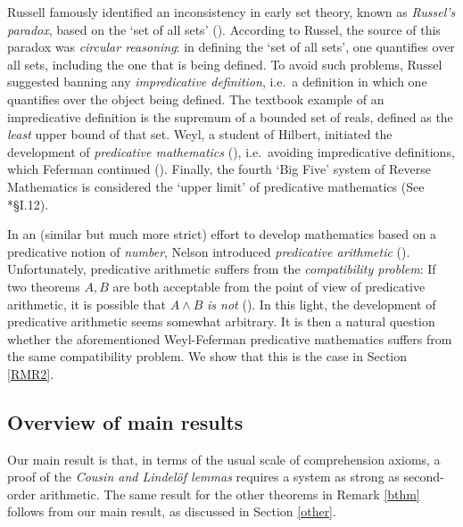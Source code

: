 \documentclass[reqno]{amsart}
\numberwithin{equation}{section}
\numberwithin{thm}{section}
\begin{document}
\smallskip

Russell famously identified an inconsistency in early set theory, known as \emph{Russel's paradox}, based on the `set of all sets' (\cite{vajuju}).  
According to Russel, the source of this paradox was \emph{circular reasoning}: in defining the `set of all sets', one quantifies over all sets, including
the one that is being defined.  To avoid such problems, Russel suggested banning any \emph{impredicative definition}, i.e.\ a definition in which one
quantifies over the object being defined.  The textbook example of an impredicative definition is the supremum of a bounded set of reals, defined as the \emph{least} upper bound of that set.  
Weyl, a student of Hilbert, initiated the development of \emph{predicative mathematics} (\cite{weyldas}), i.e.\ avoiding impredicative definitions, which Feferman continued (\cite{fefermanga,fefermandas, fefermanlight}).  Finally, the fourth `Big Five' system of Reverse Mathematics is considered the `upper limit' of predicative mathematics (See \cite{simpson2}*{\S I.12}).  
  
\smallskip

In an (similar but much more strict) effort to develop mathematics based on a predicative notion of \emph{number}, Nelson introduced \emph{predicative arithmetic} (\cite{ohnelly}).  
Unfortunately, predicative arithmetic suffers from the \emph{compatibility problem}:  
If two theorems $A, B$ are both acceptable from the point of view of predicative arithmetic, it is possible that $A\wedge B$ \emph{is not} (\cite{buss3}).  
In this light, the development of predicative arithmetic seems somewhat arbitrary.  
It is then a natural question whether the aforementioned Weyl-Feferman predicative mathematics suffers from the same compatibility problem.  We show that this is the case in Section \ref{RMR2}.

\subsection{Overview of main results}\label{basic}
Our main result is that, in terms of the usual scale of comprehension axioms, a proof of the \emph{Cousin and Lindel\"of lemmas} requires a system as strong as second-order arithmetic.  
The same result for the other theorems in Remark \ref{bthm} follows from our main result, as discussed in Section \ref{other}.  
\end{document}
